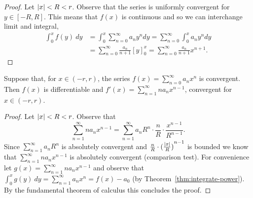 \begin{proof}
  Let \(\left|x\right|<R<r\).
  Observe that the series is uniformly convergent for \(y\in[-R,R]\).
  This means that \(f(x)\) is continuous and so we can interchange limit and integral,
  \begin{align*}
    \int_0^x f(y) \ dy
    &= \int_0^x  \sum_{n=0}^{\infty}{a_n} y^{n}dy
    = \sum_{n=0}^{\infty} \int_0^x  {a_n} y^{n}dy \\
    &= \sum_{n=0}^{\infty} \frac{a_n}{n+1} [y]_0^x
    = \sum_{n=0}^{\infty} \frac{a_n}{n+1} x^{n+1}.
  \end{align*}
\end{proof}

\begin{theorem}%
  \label{thm:differentiate-power}
  Suppose that, for \(x\in (-r,r)\), the series  \(f(x) = \sum_{n=0}^{\infty} a_n x^n\) is convergent.
  Then \(f(x)\) is differentiable and \(f'(x) =\sum_{n=1}^{\infty} n a_n x^{n-1}\), convergent for \(x\in (-r,r)\).
\end{theorem}

\begin{proof}
  Let \(\left|x\right|<R<r\).
  Observe that
  \[
    \sum_{n=1}^{\infty} n a_n x^{n-1}    = \sum_{n=1}^{\infty} a_n R^{n} \cdot \frac{n}{R} \cdot \frac{{x}^{n-1}}{R^{n-1}}.
  \]
  Since \(\sum_{n=1}^{\infty} a_n R^n\) is absolutely convergent and \(  \frac{n}{R}  \cdot {( \frac{\left|x\right|}{R} )}^{n-1}\) is bounded we know that
  \(\sum_{n=1}^{\infty} n a_n x^{n-1} \) is absolutely convergent
  (comparison test).
  For convenience let \(g(x) =\sum_{n=1}^{\infty} n a_n x^{n-1} \) and observe that
  \(\int_0^x g(y) \ dy = \sum_{n=1}^{\infty} a_n x^{n} = f(x) - a_0\) (by Theorem~\ref{thm:integrate-power}).
  By the fundamental theorem of calculus this concludes the proof.
\end{proof}




